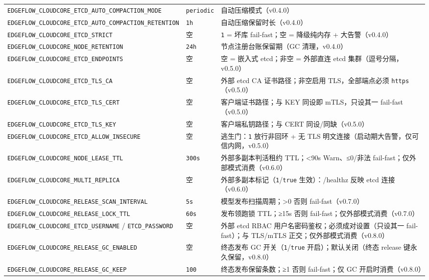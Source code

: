 \begin{table}[htbp]
\begin{tabularx}{\textwidth}{l l X}
\texttt{EDGEFLOW\_CLOUDCORE\_ETCD\_AUTO\_COMPACTION\_MODE} & \texttt{periodic} & 自动压缩模式（v0.4.0） \\
\texttt{EDGEFLOW\_CLOUDCORE\_ETCD\_AUTO\_COMPACTION\_RETENTION} & \texttt{1h} & 自动压缩保留时长（v0.4.0） \\
\texttt{EDGEFLOW\_CLOUDCORE\_ETCD\_STRICT} & 空 & \texttt{1} = 坏库 fail-fast；空 = 降级纯内存 + 大告警（v0.4.0） \\
\texttt{EDGEFLOW\_CLOUDCORE\_NODE\_RETENTION} & \texttt{24h} & 节点注册台账保留期（GC 清理，v0.4.0） \\
\texttt{EDGEFLOW\_CLOUDCORE\_ETCD\_ENDPOINTS} & 空 & 空 = 嵌入式 etcd；非空 = 外部直连 etcd 集群（逗号分隔，v0.5.0） \\
\texttt{EDGEFLOW\_CLOUDCORE\_ETCD\_TLS\_CA} & 空 & 外部 etcd CA 证书路径；非空启用 TLS，全部端点必须 \texttt{https}（v0.5.0） \\
\texttt{EDGEFLOW\_CLOUDCORE\_ETCD\_TLS\_CERT} & 空 & 客户端证书路径；与 KEY 同设即 mTLS，只设其一 fail-fast（v0.5.0） \\
\texttt{EDGEFLOW\_CLOUDCORE\_ETCD\_TLS\_KEY} & 空 & 客户端私钥路径；与 CERT 同设/同缺（v0.5.0） \\
\texttt{EDGEFLOW\_CLOUDCORE\_ETCD\_ALLOW\_INSECURE} & 空 & 逃生门：\texttt{1} 放行非回环 + 无 TLS 明文连接（启动期大告警，仅可信内网，v0.5.0） \\
\texttt{EDGEFLOW\_CLOUDCORE\_NODE\_LEASE\_TTL} & \texttt{300s} & 外部多副本判活租约 TTL；<90s Warn、≤0/非法 fail-fast；仅外部模式消费（v0.6.0） \\
\texttt{EDGEFLOW\_CLOUDCORE\_MULTI\_REPLICA} & 空 & 外部多副本标记（\texttt{1}/\texttt{true} 生效）：/healthz 反映 etcd 连接（v0.6.0） \\
\texttt{EDGEFLOW\_CLOUDCORE\_RELEASE\_SCAN\_INTERVAL} & \texttt{5s} & 模型发布扫描周期；>0 否则 fail-fast（v0.7.0） \\
\texttt{EDGEFLOW\_CLOUDCORE\_RELEASE\_LOCK\_TTL} & \texttt{60s} & 发布领跑锁 TTL；≥15s 否则 fail-fast；仅外部模式消费（v0.7.0） \\
\texttt{EDGEFLOW\_CLOUDCORE\_ETCD\_USERNAME} / \texttt{ETCD\_PASSWORD} & 空 & 外部 etcd RBAC 用户名密码鉴权；必须成对设置（只设其一 fail-fast）；与 TLS/mTLS 正交；仅外部模式消费（v0.8.0） \\
\texttt{EDGEFLOW\_CLOUDCORE\_RELEASE\_GC\_ENABLED} & 空 & 终态发布 GC 开关（\texttt{1}/\texttt{true} 开启）；默认关闭（终态 release 键永久保留，v0.8.0） \\
\texttt{EDGEFLOW\_CLOUDCORE\_RELEASE\_GC\_KEEP} & \texttt{100} & 终态发布保留条数；≥1 否则 fail-fast；仅 GC 开启时消费（v0.8.0） \\

\end{tabularx}
\end{table}
